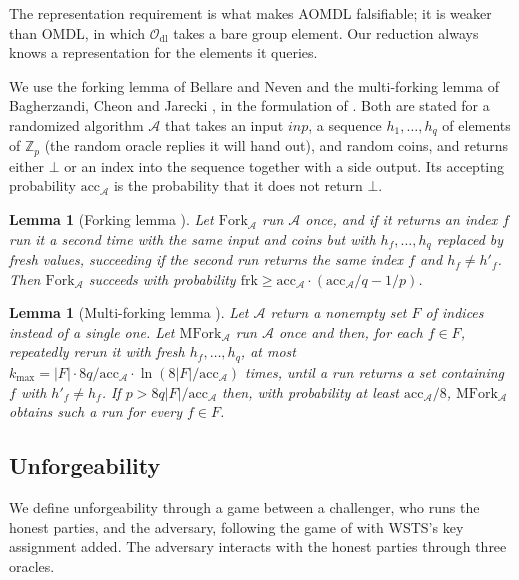 \documentclass{article}
\theoremstyle{plain}
\newtheorem{lem}[thm]{Lemma}
\theoremstyle{definition}
\theoremstyle{remark}
\begin{document}
The representation requirement is what makes AOMDL falsifiable; it is weaker than OMDL, in which $\mathcal{O}_{\mathrm{dl}}$ takes a bare group element.  Our reduction always knows a representation for the elements it queries.

We use the forking lemma of Bellare and Neven \cite{bn06} and the multi-forking lemma of Bagherzandi, Cheon and Jarecki \cite{bcj08}, in the formulation of \cite[Lemmas~1 and~2]{cgrs23}.  Both are stated for a randomized algorithm $\mathcal{A}$ that takes an input $\mathit{inp}$, a sequence $h_1, \ldots, h_q$ of elements of $\mathbb{Z}_p$ (the random oracle replies it will hand out), and random coins, and returns either $\bot$ or an index into the sequence together with a side output.  Its accepting probability $\mathrm{acc}_{\mathcal{A}}$ is the probability that it does not return $\bot$.

\begin{lem}[Forking lemma \cite{bn06}]\label{lemma:bn}
  Let $\mathrm{Fork}_{\mathcal{A}}$ run $\mathcal{A}$ once, and if it returns an index $f$ run it a second time with the same input and coins but with $h_f, \ldots, h_q$ replaced by fresh values, succeeding if the second run returns the same index $f$ and $h_f \ne h'_f$.  Then $\mathrm{Fork}_{\mathcal{A}}$ succeeds with probability $\mathrm{frk} \ge \mathrm{acc}_{\mathcal{A}} \cdot (\mathrm{acc}_{\mathcal{A}} / q - 1/p)$.
\end{lem}

\begin{lem}[Multi-forking lemma \cite{bcj08}]\label{lemma:bcj}
  Let $\mathcal{A}$ return a nonempty set $F$ of indices instead of a single one.  Let $\mathrm{MFork}_{\mathcal{A}}$ run $\mathcal{A}$ once and then, for each $f \in F$, repeatedly rerun it with fresh $h_f, \ldots, h_q$, at most $k_{\max} = |F| \cdot 8q / \mathrm{acc}_{\mathcal{A}} \cdot \ln(8|F| / \mathrm{acc}_{\mathcal{A}})$ times, until a run returns a set containing $f$ with $h'_f \ne h_f$.  If $p > 8q |F| / \mathrm{acc}_{\mathcal{A}}$ then, with probability at least $\mathrm{acc}_{\mathcal{A}} / 8$, $\mathrm{MFork}_{\mathcal{A}}$ obtains such a run for every $f \in F$.
\end{lem}

\subsection{
  Unforgeability
}\label{section:unforgeability}

We define unforgeability through a game between a challenger, who runs the honest parties, and the adversary, following the game of \cite[Fig.~2]{cgrs23} with WSTS's key assignment added.  The adversary interacts with the honest parties through three oracles.
\end{document}
